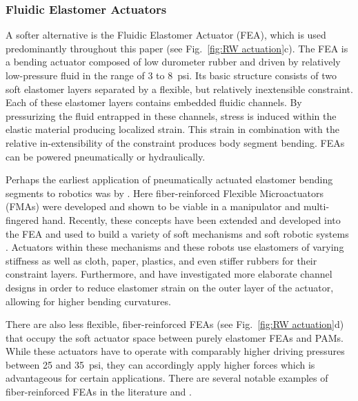 \subsubsection{Fluidic Elastomer Actuators}
\label{subsubsec:RW FEA}
A softer alternative is the Fluidic Elastomer Actuator (FEA), which is used predominantly throughout this paper (see Fig.~\ref{fig:RW actuation}c).
The FEA is a bending actuator composed of low durometer rubber and driven by relatively low-pressure fluid in the range of 3 to 8~psi.
Its basic structure consists of two soft elastomer layers separated by a flexible, but relatively inextensible constraint.
Each of these elastomer layers contains embedded fluidic channels.
By pressurizing the fluid entrapped in these channels, stress is induced within the elastic material producing localized strain. This strain in combination with the relative in-extensibility of the constraint produces body segment bending.
FEAs can be powered pneumatically or hydraulically.

Perhaps the earliest application of pneumatically actuated elastomer bending segments to robotics was by \citet{suzumori1992applying}.
Here fiber-reinforced Flexible Microactuators (FMAs) were developed and shown to be viable in a manipulator and multi-fingered hand.
Recently, these concepts have been extended and developed into the FEA and used to build a variety of soft mechanisms \citep{shepherd2011multigait, ilievski2011soft, morin2012camouflage, martinez2013robotic, marchese2014autonomous, marchese2014design, marchese2014whole, katzschmann2014hydraulic, tolley2014untethered, katzschmann2015autonomous, marchese2015design, marchese2015control, marchese2015dynamics}
and soft robotic systems
\citep{onal2011soft, marchese2011soft, onal2013autonomous, marchese2014autonomous, marchese2014design, marchese2014whole, katzschmann2014hydraulic, tolley2014untethered, tolley2014resilient, katzschmann2015autonomous, marchese2015design, marchese2015control, marchese2015dynamics}.
Actuators within these mechanisms and these robots use elastomers of varying stiffness as well as cloth, paper, plastics, and even stiffer rubbers for their constraint layers.
Furthermore, \citet{polygerinos2013towards} and \citet{mosadegh2014pneumatic} have investigated more elaborate channel designs in order to reduce elastomer strain on the outer layer of the actuator, allowing for higher bending curvatures.

There are also less flexible, fiber-reinforced FEAs (see Fig.~\ref{fig:RW actuation}d) that occupy the soft actuator space between purely elastomer FEAs and PAMs.
While these actuators have to operate with comparably higher driving pressures between 25 and 35~psi, they can accordingly apply higher forces which is advantageous for certain applications.
There are several notable examples of fiber-reinforced FEAs in the literature \citet{suzumori1992applying, suzumori2007bending, bishop2012design, galloway2013mechanically, deimel2013compliant, deimel2014novel} and \citet{park2014design}.

